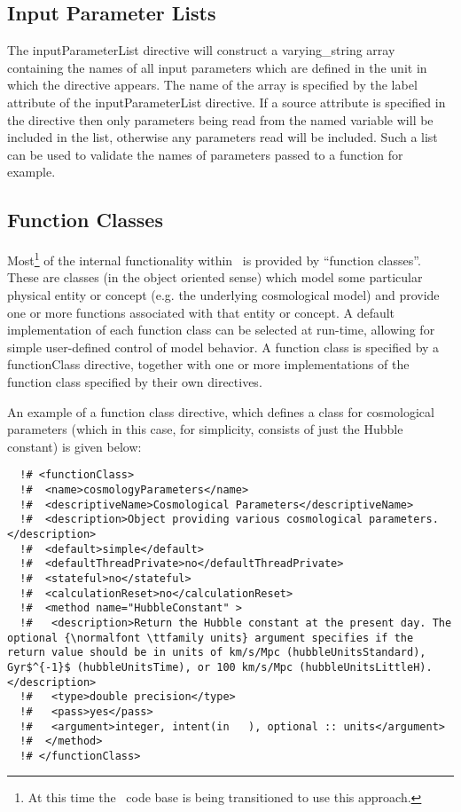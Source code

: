 \subsection{Input Parameter Lists}

The {\normalfont \ttfamily inputParameterList} directive will construct a {\normalfont \ttfamily varying\_string} array containing the names of all input parameters which are defined in the unit in which the directive appears. The name of the array is specified by the {\normalfont \ttfamily label} attribute of the {\normalfont \ttfamily inputParameterList} directive. If a {\normalfont \ttfamily source} attribute is specified in the directive then only parameters being read from the named variable will be included in the list, otherwise any parameters read will be included. Such a list can be used to validate the names of parameters passed to a function for example.

\subsection{Function Classes}

Most\footnote{At this time the \protect\glc\ code base is being transitioned to use this approach.} of the internal functionality within \glc\ is provided by ``function classes''. These are classes (in the object oriented sense) which model some particular physical entity or concept (e.g. the underlying cosmological model) and provide one or more functions associated with that entity or concept. A default implementation of each function class can be selected at run-time, allowing for simple user-defined control of model behavior. A function class is specified by a {\normalfont \ttfamily functionClass} directive, together with one or more implementations of the function class specified by their own directives.

An example of a function class directive, which defines a class for cosmological parameters (which in this case, for simplicity, consists of just the Hubble constant) is given below:

\begin{lstlisting}
  !# <functionClass>
  !#  <name>cosmologyParameters</name>
  !#  <descriptiveName>Cosmological Parameters</descriptiveName>
  !#  <description>Object providing various cosmological parameters.</description>
  !#  <default>simple</default>
  !#  <defaultThreadPrivate>no</defaultThreadPrivate>
  !#  <stateful>no</stateful>
  !#  <calculationReset>no</calculationReset>
  !#  <method name="HubbleConstant" >
  !#   <description>Return the Hubble constant at the present day. The optional {\normalfont \ttfamily units} argument specifies if the return value should be in units of km/s/Mpc (hubbleUnitsStandard), Gyr$^{-1}$ (hubbleUnitsTime), or 100 km/s/Mpc (hubbleUnitsLittleH).</description>
  !#   <type>double precision</type>
  !#   <pass>yes</pass>
  !#   <argument>integer, intent(in   ), optional :: units</argument>
  !#  </method>
  !# </functionClass>
\end{lstlisting}

